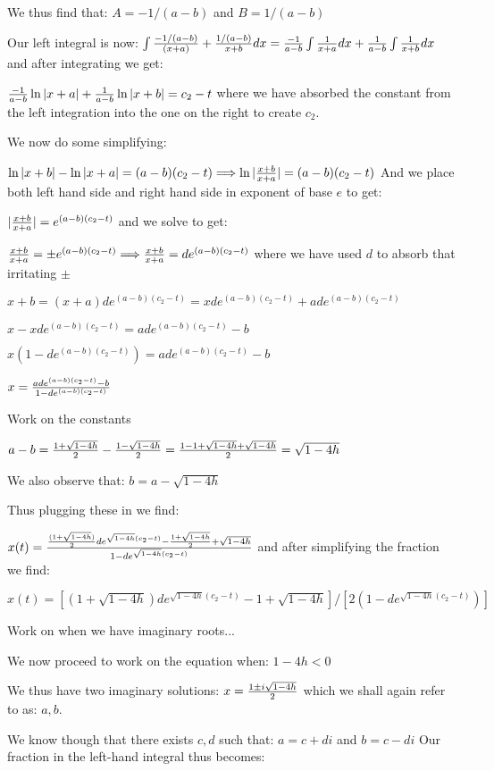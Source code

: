 \documentclass[11pt,letterpaper]{article}
\begin{document}
We thus find that: $A=-1/(a-b)$ and $B=1/(a-b)$

Our left integral is now: $\int {-1/(a-b)\over(x+a)}+{1/(a-b)\over x+b}dx={-1\over a-b}\int {1\over x+a}dx+{1\over a-b}\int{1\over x+b}dx$ and after integrating we get:

${-1\over a-b}\ln{|x+a|}+{1\over a-b}\ln{|x+b|}=c_2-t$ where we have absorbed the constant from the left integration into the one on the right to create $c_2$.

We now do some simplifying:

$\ln|x+b|-\ln|x+a|=(a-b)(c_2-t) \Longrightarrow \ln|{x+b\over x+a}|=(a-b)(c_2-t)$ And we place both left hand side and right hand side in exponent of base $e$ to get:

$|{x+b\over x+a}|=e^{(a-b)(c_2-t)}$ and we solve to get:

${x+b\over x+a}=\pm e^{(a-b)(c_2-t)} \Longrightarrow {x+b\over x+a}=d e^{(a-b)(c_2-t)}$ where we have used $d$ to absorb that irritating $\pm$

$x+b=(x+a)de^{(a-b)(c_2-t)}=xde^{(a-b)(c_2-t)}+ade^{(a-b)(c_2-t)}$

$x-xde^{(a-b)(c_2-t)}=ade^{(a-b)(c_2-t)}-b$

$x(1-de^{(a-b)(c_2-t)})=ade^{(a-b)(c_2-t)}-b$

$x={ade^{(a-b)(c_2-t)}-b\over 1-de^{(a-b)(c_2-t)}}$

Work on the constants

$a-b={1+\sqrt{1-4h}\over 2}-{1-\sqrt{1-4h}\over 2}={1-1+\sqrt{1-4h}+\sqrt{1-4h}\over 2}=\sqrt{1-4h}$

We also observe that: $b=a-\sqrt{1-4h}$

Thus plugging these in we find:

$x(t)={{(1+\sqrt{1-4h})\over 2}de^{\sqrt{1-4h}(c_2-t)}-{1+\sqrt{1-4h}\over 2}+\sqrt{1-4h}\over 1-de^{\sqrt{1-4h}(c_2-t)}}$ and after simplifying the fraction we find:

$x(t)=[(1+\sqrt{1-4h})de^{\sqrt{1-4h}(c_2-t)}-1+\sqrt{1-4h}]/[ 2(1-de^{\sqrt{1-4h}(c_2-t)})]$

Work on when we have imaginary roots...

We now proceed to work on the equation when: $1-4h<0$

We thus have two imaginary solutions: $x={1\pm i\sqrt{1-4h}\over 2}$ which we shall again refer to as: $a,b$. 

We know though that there exists $c,d$ such that: $a=c+di$ and $b=c-di$ Our fraction in the left-hand integral thus becomes:
\end{document}
